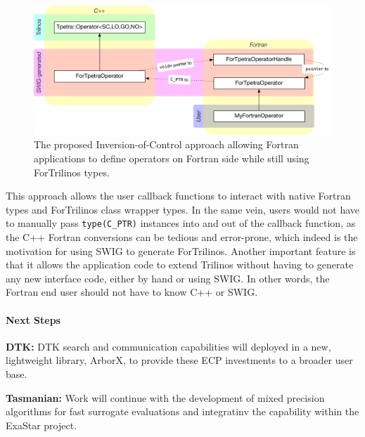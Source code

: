 \begin{figure}[htb]
    \centering
    \includegraphics[scale=0.8,width=6in]{projects/2.3.3-MathLibs/2.3.3.14-ALExa-ForTrilinos/ForTrilinos_ioc}
    \caption{\label{fig:fortran_ioc}The proposed Inversion-of-Control approach
    allowing Fortran applications to define operators on Fortran side while
    still using ForTrilinos types.}
\end{figure}

This approach allows the user callback functions to interact with native Fortran
types and ForTrilinos class wrapper types. In the same vein, users would not
have to manually pass \texttt{type(C\_PTR)} instances into and out of the
callback function, as the C++ Fortran conversions can be tedious and
error-prone, which indeed is the motivation for using SWIG to generate
ForTrilinos.  Another important feature is that it allows the application code
to extend Trilinos without having to generate any new interface code, either by
hand or using SWIG. In other words, the Fortran end user should not have to know
C++ or SWIG.


\paragraph{Next Steps}

\indent

{\bf DTK:} DTK search and communication capabilities will deployed in a new,
lightweight library, ArborX, to provide these ECP investments to a broader
user base.

{\bf Tasmanian:} Work will continue with the development of mixed precision
algorithms for fast surrogate evaluations and integratinv the capability within
the ExaStar project.

